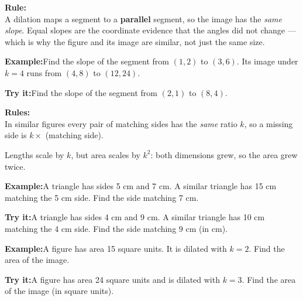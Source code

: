 \documentclass[12pt]{article}
\begin{document}
\begin{formulabox}\textbf{Rule:}\\[4pt]
A dilation maps a segment to a \textbf{parallel} segment, so the image has the
\emph{same slope}. Equal slopes are the coordinate evidence that the angles did not
change --- which is why the figure and its image are similar, not just the same size.
\end{formulabox}
\begin{examplebox}\textbf{Example:}\quad Find the slope of the segment from $(1, 2)$ to
$(3, 6)$. Its image under $k = 4$ runs from $(4, 8)$ to $(12, 24)$.
\end{examplebox}
\begin{tryitbox}\textbf{Try it:}\quad Find the slope of the segment from $(2, 1)$ to
$(8, 4)$.\\[2pt]
\end{tryitbox}

\begin{formulabox}\textbf{Rules:}\\[4pt]
In similar figures every pair of matching sides has the \emph{same} ratio $k$, so a
missing side is $k \times$ (matching side).\par
Lengths scale by $k$, but area scales by $k^2$: both dimensions grew, so the area grew twice.
\end{formulabox}
\begin{examplebox}\textbf{Example:}\quad A triangle has sides 5 cm and 7 cm. A similar
triangle has 15 cm matching the 5 cm side. Find the side matching 7 cm.
\end{examplebox}
\begin{tryitbox}\textbf{Try it:}\quad A triangle has sides 4 cm and 9 cm. A similar
triangle has 10 cm matching the 4 cm side. Find the side matching 9 cm (in cm).\\[2pt]
\end{tryitbox}

\begin{examplebox}\textbf{Example:}\quad A figure has area 15 square units. It is dilated
with $k = 2$. Find the area of the image.
\end{examplebox}
\begin{tryitbox}\textbf{Try it:}\quad A figure has area 24 square units and is dilated
with $k = 3$. Find the area of the image (in square units).\\[2pt]
\end{tryitbox}
\end{document}
